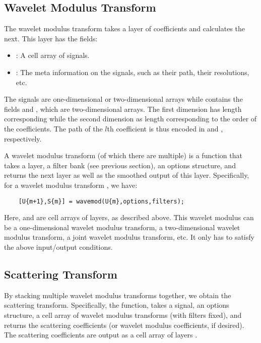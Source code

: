 \documentclass[twocolumn]{article}
\begin{document}
\subsection{Wavelet Modulus Transform}

The wavelet modulus transform takes a layer of coefficients and calculates the next. This layer has the fields:
\begin{itemize}
	\item {}: A cell array of signals.
	\item {}: The meta information on the signals, such as their path, their resolutions, etc.
\end{itemize}
The signals are one-dimensional or two-dimensional arrays while  contains the fields  and , which are two-dimensional arrays. The first dimension has length corresponding  while the second dimension as length corresponding to the order of the coefficients. The path of the $l$th coefficient is thus encoded in  and , respectively.

A wavelet modulus transform (of which there are multiple) is a function that takes a layer, a filter bank (see previous section), an options structure, and returns the next layer as well as the smoothed output of this layer. Specifically, for a wavelet modulus transform , we have:
\begin{lstlisting}
	[U{m+1},S{m}] = wavemod(U{m},options,filters);
\end{lstlisting}
Here,  and  are cell arrays of layers, as described above. This wavelet modulus can be a one-dimensional wavelet modulus transform, a two-dimensional wavelet modulus transform, a joint wavelet modulus transform, etc. It only has to satisfy the above input/output conditions.

\subsection{Scattering Transform}

By stacking multiple wavelet modulus transforms together, we obtain the scattering transform. Specifically, the  function, takes a signal, an options structure, a cell array of wavelet modulus transforms (with filters fixed), and returns the scattering coefficients (or wavelet modulus coefficients, if desired). The scattering coefficients are output as a cell array of layers .
\end{document}

